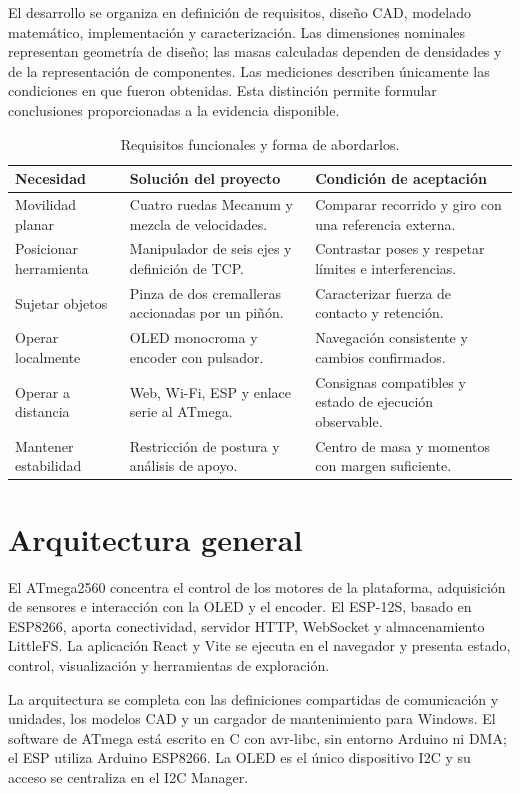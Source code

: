 El desarrollo se organiza en definición de requisitos, diseño CAD, modelado matemático, implementación y caracterización. Las dimensiones nominales representan geometría de diseño; las masas calculadas dependen de densidades y de la representación de componentes. Las mediciones describen únicamente las condiciones en que fueron obtenidas. Esta distinción permite formular conclusiones proporcionadas a la evidencia disponible.

\begin{table}[!htbp]
\centering\small
\caption{Requisitos funcionales y forma de abordarlos.}
\begin{tabularx}{\linewidth}{@{}P{33mm}YY@{}}
\toprule
\textbf{Necesidad} & \textbf{Solución del proyecto} & \textbf{Condición de aceptación}\\\midrule
Movilidad planar & Cuatro ruedas Mecanum y mezcla de velocidades. & Comparar recorrido y giro con una referencia externa.\\
Posicionar herramienta & Manipulador de seis ejes y definición de TCP. & Contrastar poses y respetar límites e interferencias.\\
Sujetar objetos & Pinza de dos cremalleras accionadas por un piñón. & Caracterizar fuerza de contacto y retención.\\
Operar localmente & OLED monocroma y encoder con pulsador. & Navegación consistente y cambios confirmados.\\
Operar a distancia & Web, Wi-Fi, ESP y enlace serie al ATmega. & Consignas compatibles y estado de ejecución observable.\\
Mantener estabilidad & Restricción de postura y análisis de apoyo. & Centro de masa y momentos con margen suficiente.\\
\bottomrule
\end{tabularx}
\end{table}

\section{Arquitectura general}
El ATmega2560 concentra el control de los motores de la plataforma, adquisición de sensores e interacción con la OLED y el encoder. El ESP-12S, basado en ESP8266, aporta conectividad, servidor HTTP, WebSocket y almacenamiento LittleFS. La aplicación React y Vite se ejecuta en el navegador y presenta estado, control, visualización y herramientas de exploración.

La arquitectura se completa con las definiciones compartidas de comunicación y unidades, los modelos CAD y un cargador de mantenimiento para Windows. El software de ATmega está escrito en C con avr-libc, sin entorno Arduino ni DMA; el ESP utiliza Arduino ESP8266. La OLED es el único dispositivo I2C y su acceso se centraliza en el I2C Manager.

